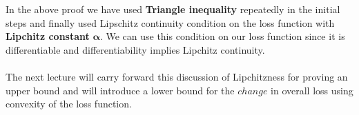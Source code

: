 \documentclass[12pt]{article}
\begin{document}
\noindent In the above proof we have used \textbf{Triangle inequality} repeatedly in the initial steps and finally used Lipschitz continuity condition on the loss function with \textbf{Lipchitz constant} $\boldsymbol{\alpha}$. We can use this condition on our loss function since it is differentiable and differentiability implies Lipchitz continuity. \\ \\
\noindent The next lecture will carry forward this discussion of Lipchitzness for proving an upper bound and will introduce a lower bound for the $change$ in overall loss using convexity of the loss function.



%


\end{document}
